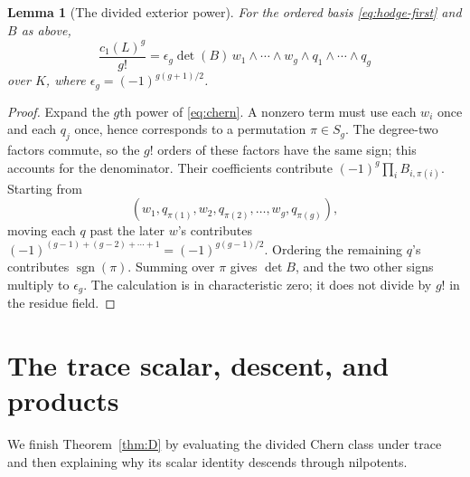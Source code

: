 \documentclass[11pt]{article}
\newtheorem{lemma}[theorem]{Lemma}
\theoremstyle{definition}\newtheorem{definition}[theorem]{Definition}
\theoremstyle{remark}\newtheorem{remark}[theorem]{Remark}
\begin{document}
\begin{lemma}[The divided exterior power]\label{lem:wedge}
For the ordered basis \eqref{eq:hodge-first} and $B$ as above,
\begin{equation}\label{eq:wedge}
 \frac{c_1(L)^g}{g!}
 =\epsilon_g\det(B)\,
 w_1\wedge\cdots\wedge w_g\wedge q_1\wedge\cdots\wedge q_g
\end{equation}
over $K$, where $\epsilon_g=(-1)^{g(g+1)/2}$.
\end{lemma}
\begin{proof}
Expand the $g$th power of \eqref{eq:chern}. A nonzero term must use each $w_i$ once and each $q_j$ once, hence corresponds to a permutation $\pi\in S_g$. The degree-two factors commute, so the $g!$ orders of these factors have the same sign; this accounts for the denominator. Their coefficients contribute $(-1)^g\prod_iB_{i,\pi(i)}$. Starting from
\[
 (w_1,q_{\pi(1)},w_2,q_{\pi(2)},\ldots,w_g,q_{\pi(g)}),
\]
moving each $q$ past the later $w$'s contributes
$(-1)^{(g-1)+(g-2)+\cdots+1}=(-1)^{g(g-1)/2}$.
Ordering the remaining $q$'s contributes $\operatorname{sgn}(\pi)$.
Summing over $\pi$ gives $\det B$, and the two other signs multiply to $\epsilon_g$. The calculation is in characteristic zero; it does not divide by $g!$ in the residue field.
\end{proof}

\section{The trace scalar, descent, and products}\label{sec:sign}

We finish Theorem~\ref{thm:D} by evaluating the divided Chern class under trace and then explaining why its scalar identity descends through nilpotents.
\end{document}

